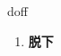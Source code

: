 
\begin{frame}
{\huge doff}
\begin{center}
\begin{enumerate}\Large
  \item \textbf{脱下}
\end{enumerate}
\end{center}
\end{frame}
